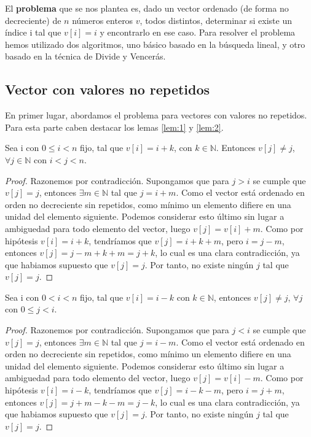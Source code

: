 El \textbf{problema} que se nos plantea es, dado un vector ordenado (de forma no decreciente) de $n$ números enteros $v$, todos 
distintos, determinar si existe un índice i tal que $v[i] = i$ y 
encontrarlo en ese caso. Para resolver el problema hemos utilizado dos algoritmos, uno básico basado en 
la búsqueda lineal, y otro basado en la técnica de Divide y Vencerás. 

\subsection{Vector con valores no repetidos}

En primer lugar, abordamos el problema para vectores con valores no repetidos. Para esta parte
caben destacar los lemas \ref{lem:1} y \ref{lem:2}. 


\begin{lemma}
    \label{lem:1}
    Sea i con $0 \leqslant i < n$ fijo, tal que $v[i]=i+k$, con $k \in \mathbb N$. 
    Entonces $v[j] \neq j$, $\forall j \in \mathbb N$ con $i < j < n$. 
\end{lemma}

\begin{proof}
    Razonemos por contradicción. Supongamos que para $j > i$ se 
    cumple que $v[j]=j$, entonces $\exists m \in \mathbb N$ tal que $j=i+m$. Como el 
    vector está ordenado en orden no decreciente sin repetidos, como mínimo un elemento
    difiere en una unidad del elemento siguiente. Podemos considerar esto último sin 
    lugar a ambiguedad para todo elemento del vector, luego $v[j]=v[i]+m$. Como por hipótesis
    $v[i]=i+k$, tendríamos que $v[j]=i+k+m$, pero $i=j-m$, entonces $v[j]=j-m+k+m=j+k$, lo
    cual es una clara contradicción, ya que habiamos supuesto que $v[j]=j$. Por tanto, no 
    existe ningún $j$ tal que $v[j]=j$.
\end{proof}

\begin{lemma}
    \label{lem:2}
    Sea i con $0 < i < n$ fijo, tal que $v[i]=i-k$ con 
    $k \in \mathbb N$, entonces $v[j] \neq j$,  $\forall j$ con $0 \leqslant j < i$. 
\end{lemma}

\begin{proof}
    Razonemos por contradicción. Supongamos que para $j < i$ se 
    cumple que $v[j]=j$, entonces $\exists m \in \mathbb N$ tal que $j=i-m$. Como el 
    vector está ordenado en orden no decreciente sin repetidos, como mínimo un elemento
    difiere en una unidad del elemento siguiente. Podemos considerar esto último sin 
    lugar a ambiguedad para todo elemento del vector, luego $v[j]=v[i]-m$. Como por hipótesis
    $v[i]=i-k$, tendríamos que $v[j]=i-k-m$, pero $i=j+m$, entonces $v[j]=j+m-k-m=j-k$, lo
    cual es una clara contradicción, ya que habiamos supuesto que $v[j]=j$. Por tanto, no 
    existe ningún $j$ tal que $v[j]=j$.
\end{proof}

